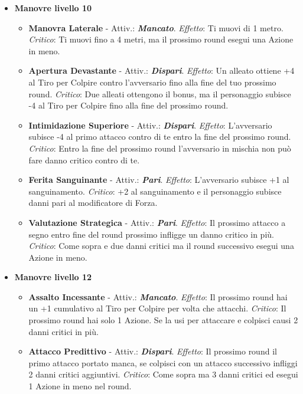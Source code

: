 \begin{multicols}{2}
\begin{itemize}[leftmargin=*]
	\item \textbf{Manovre livello 10}
	\begin{itemize}[leftmargin=*]
		\setlength{\itemsep}{0pt}
		\item \textbf{Manovra Laterale} - Attiv.: \textbf{\emph{Mancato}}. \emph{Effetto}: Ti muovi di 1 metro. \emph{Critico}: Ti muovi fino a 4 metri, ma il prossimo round esegui una Azione in meno.

		\item \textbf{Apertura Devastante} - Attiv.: \textbf{\emph{Dispari}}. \emph{Effetto}: Un alleato ottiene +4 al Tiro per Colpire contro l'avversario fino alla fine del tuo prossimo round. \emph{Critico}: Due alleati ottengono il bonus, ma il personaggio subisce -4 al Tiro per Colpire fino alla fine del prossimo round.

		\item \textbf{Intimidazione Superiore} - Attiv.: \textbf{\emph{Dispari}}. \emph{Effetto}: L'avversario subisce -4 al primo attacco contro di te entro la fine del prossimo round. \emph{Critico}: Entro la fine del prossimo round l'avversario in mischia non può fare danno critico contro di te.

		\item \textbf{Ferita Sanguinante} - Attiv.: \textbf{\emph{Pari}}. \emph{Effetto}: L'avversario subisce +1 al sanguinamento. \emph{Critico}: +2 al sanguinamento e il personaggio subisce danni pari al modificatore di Forza.

		\item \textbf{Valutazione Strategica} - Attiv.: \textbf{\emph{Pari}}. \emph{Effetto}: Il prossimo attacco a segno entro fine del round prossimo infligge un danno critico in più. \emph{Critico}: Come sopra e due danni critici ma il round successivo esegui una Azione in meno.
	\end{itemize}

	\item \textbf{Manovre livello 12}
	\begin{itemize}[leftmargin=*]
		\setlength{\itemsep}{0pt}
		\item \textbf{Assalto Incessante} - Attiv.: \textbf{\emph{Mancato}}. \emph{Effetto}: Il prossimo round hai un +1 cumulativo al Tiro per Colpire per volta che attacchi. \emph{Critico}: Il prossimo round hai solo 1 Azione. Se la usi per attaccare e colpisci causi 2 danni critici in più.

		\item \textbf{Attacco Predittivo} - Attiv.: \textbf{\emph{Dispari}}. \emph{Effetto}: Il prossimo round il primo attacco portato manca, se colpisci con un attacco successivo infliggi 2 danni critici aggiuntivi. \emph{Critico}: Come sopra ma 3 danni critici ed esegui 1 Azione in meno nel round.


\end{itemize}
\end{itemize}
\end{multicols}
